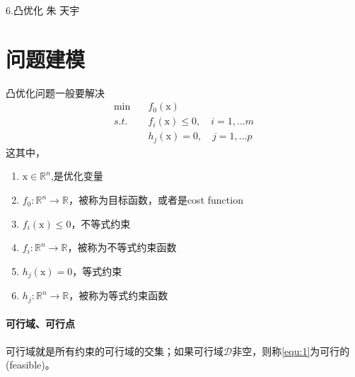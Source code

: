 \documentclass[a4paper]{D:/MyRepo/Script/latex/PaperReadingLog}
\begin{document}
\PaperInfo
{6.凸优化}
{朱}
{天宇}
{}

\section{问题建模}
凸优化问题一般要解决
\begin{equation}
    \label{equ:1}
    \begin{aligned}
        \min\quad&f_0(\mathrm{x})\\
        s.t.\quad&f_i(\mathrm{x})\le0,\quad i=1,...m\\
        &h_j(\mathrm{x})=0,\quad j=1,...p
    \end{aligned}
\end{equation}
这其中，\begin{enumerate}
    \item $\mathrm{x}\in\mathbb{R}^n$,是优化变量
    \item $f_0:\mathbb{R}^n\rightarrow \mathbb{R}$，被称为目标函数，或者是cost function
    \item $f_i(\mathrm{x})\le0$，不等式约束
    \item $f_i:\mathbb{R}^n\rightarrow \mathbb{R}$，被称为不等式约束函数
    \item $h_j(\mathrm{x})=0$，等式约束
    \item $h_j:\mathbb{R}^n\rightarrow \mathbb{R}$，被称为等式约束函数
\end{enumerate}

\paragraph{可行域、可行点}
可行域就是所有约束的可行域的交集；如果可行域$\mathcal{D}$非空，则称\ref{equ:1}为可行的(feasible)。
\end{document}
